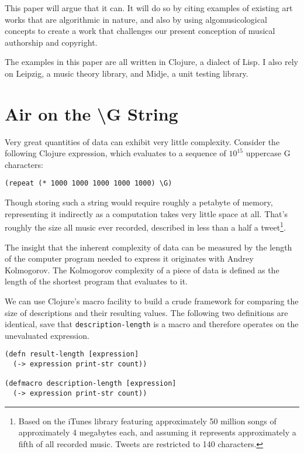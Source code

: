 \documentclass[numbers]{sigplanconf}
\begin{document}
This paper will argue that it can. It will do so by citing examples of existing art works that are algorithmic in nature, and
also by using algomusicological concepts to create a work that challenges our present conception of musical authorship and
copyright.

The examples in this paper are all written in Clojure\cite{Clojure}, a dialect of Lisp. I also rely on Leipzig\cite{Leipzig},
a music theory library, and Midje\cite{Midje}, a unit testing library.

\section{Air on the {\textbackslash}G String\cite{Air on the G String}}
Very great quantities of data can exhibit very little complexity. Consider the following Clojure expression, which
evaluates to a sequence of $10^{15}$ uppercase G characters:

\begin{verbatim}
(repeat (* 1000 1000 1000 1000 1000) \G)
\end{verbatim}

Though storing such a string would require roughly a petabyte of memory, representing it indirectly as a computation
takes very little space at all. That's roughly the size all music ever recorded,
described in less than a half a tweet\footnote{Based on the iTunes library featuring approximately 50 million songs
of approximately 4 megabytes each, and assuming it represents approximately a fifth of all recorded music. Tweets are
restricted to 140 characters.}.

The insight that the inherent complexity of data can be measured by the length of the computer program needed to express it
originates with Andrey Kolmogorov\cite{On Tables of Random Numbers}. The Kolmogorov complexity of a piece of data is defined
as the length of the shortest program that evaluates to it.

We can use Clojure's macro facility to build a crude framework for comparing the size of descriptions and their
resulting values. The following two definitions are identical, save that \verb|description-length| is a macro and therefore
operates on the unevaluated expression.

\begin{verbatim}
(defn result-length [expression]
  (-> expression print-str count))

(defmacro description-length [expression]
  (-> expression print-str count))
\end{verbatim}
\end{document}
